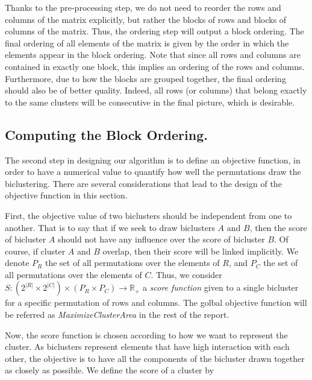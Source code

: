\documentclass[twoside,leqno,twocolumn]{article}
\theoremstyle{definition}
\begin{document}
\medskip

\noindent Thanks to the pre-processing step, we do not need to reorder the rows and columns of the matrix explicitly, but rather the blocks of rows and blocks of columns of the matrix. Thus, the ordering step will output a block ordering. The final ordering of all elements of the matrix is given by the order in which the elements appear in the block ordering. Note that since all rows and columns are contained in exactly one block, this implies an ordering of the rows and columns. Furthermore, due to how the blocks are grouped together, the final ordering should also be of better quality. Indeed, all rows (or columns) that belong exactly to the same clusters will be consecutive in the final picture, which is desirable.


\subsection{Computing the Block Ordering.}
The second step in designing our algorithm is to define an objective function, in order to have a numerical value to quantify how well the permutations draw the biclustering. There are several considerations that lead to the design of the objective function in this section.

\medskip

\noindent \sloppy First, the objective value of two biclusters should be independent from one to another. That is to say that if we seek to draw biclusters $A$ and $B$, then the score of bicluster $A$ should not have any influence over the score of bicluster $B$. Of course, if cluster $A$ and $B$ overlap, then their score will be linked implicitly. We denote $P_R$ the set of all permutations over the elements of $R$, and $P_C$ the set of all permutations over the elements of $C$. Thus, we consider $S:(2^{|R|}\times 2^{|C|})\times (P_R\times P_C)\xrightarrow[]{}\mathbb{R}_+$ a \emph{score function} given to a single bicluster for a specific permutation of rows and columns. The golbal objective function will be referred as \textit{MaximizeClusterArea} in the rest of the report.


\bigskip

\noindent Now, the score function is chosen according to how we want to represent the cluster. As biclusters represent elements that have high interaction with each other, the objective is to have all the components of the bicluster drawn together as closely as possible. We define the score of a cluster by
\end{document}
